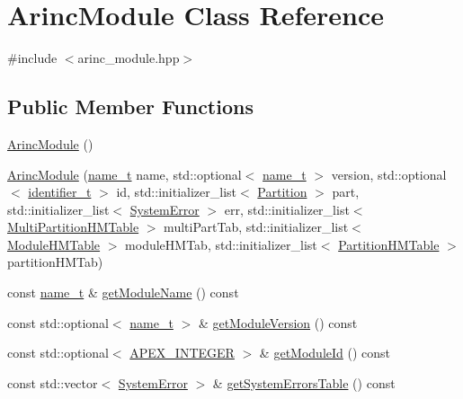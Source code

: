 \hypertarget{classArincModule}{}\section{Arinc\+Module Class Reference}
\label{classArincModule}


{\ttfamily \#include $<$arinc\+\_\+module.\+hpp$>$}

\subsection*{Public Member Functions}
\begin{DoxyCompactItemize}
\item 
\hyperlink{classArincModule_add5d508aa61f9682e7b0b08b7962a85e}{Arinc\+Module} ()
\item 
\hyperlink{classArincModule_a2d9dace604f363788f20c90f5a63350f}{Arinc\+Module} (\hyperlink{structname__t}{name\+\_\+t} name, std\+::optional$<$ \hyperlink{structname__t}{name\+\_\+t} $>$ version, std\+::optional$<$ \hyperlink{general__types_8hpp_a824b78b06da8112c2772bc666a63638d}{identifier\+\_\+t} $>$ id, std\+::initializer\+\_\+list$<$ \hyperlink{classPartition}{Partition} $>$ part, std\+::initializer\+\_\+list$<$ \hyperlink{classSystemError}{System\+Error} $>$ err, std\+::initializer\+\_\+list$<$ \hyperlink{classMultiPartitionHMTable}{Multi\+Partition\+H\+M\+Table} $>$ multi\+Part\+Tab, std\+::initializer\+\_\+list$<$ \hyperlink{classModuleHMTable}{Module\+H\+M\+Table} $>$ module\+H\+M\+Tab, std\+::initializer\+\_\+list$<$ \hyperlink{classPartitionHMTable}{Partition\+H\+M\+Table} $>$ partition\+H\+M\+Tab)
\item 
const \hyperlink{structname__t}{name\+\_\+t} \& \hyperlink{classArincModule_ab5717066ca1c51c462bd458d75d9b33d}{get\+Module\+Name} () const 
\item 
const std\+::optional$<$ \hyperlink{structname__t}{name\+\_\+t} $>$ \& \hyperlink{classArincModule_a1697cfd476ca1ff2580a79b2106907d7}{get\+Module\+Version} () const 
\item 
const std\+::optional$<$ \hyperlink{apex__types_8h_a4e13487a80a5740717e19f7f693e06c3}{A\+P\+E\+X\+\_\+\+I\+N\+T\+E\+G\+ER} $>$ \& \hyperlink{classArincModule_a582c1d93e5963a5e04814a6ef5084233}{get\+Module\+Id} () const 
\item 
const std\+::vector$<$ \hyperlink{classSystemError}{System\+Error} $>$ \& \hyperlink{classArincModule_ae775a3a084ffdcd8bfa4b18892dda5df}{get\+System\+Errors\+Table} () const 
\item 

\end{DoxyCompactItemize}
